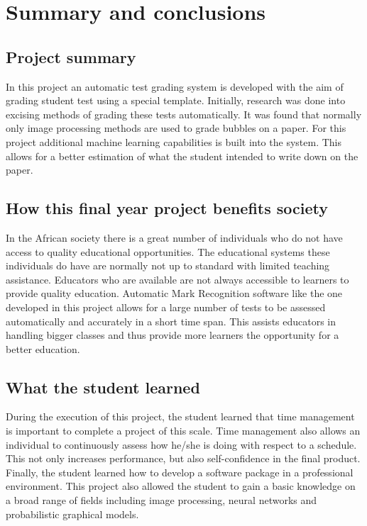 \def\baselinestretch{1}
\chapter{Summary and conclusions}
\label{ch:Conclusions}

\graphicspath{{Conclusions/Figures_Conclusions/}}
\section{Project summary}
In this project an automatic test grading system is developed with the aim of grading student test using a special template. Initially, research was done into excising methods of grading these tests automatically. It was found that normally only image processing methods are used to grade bubbles on a paper. For this project additional machine learning capabilities is built into the system. This allows for a better estimation of what the student  intended to write down on the paper.

\section{How this final year project benefits society}
In the African society there is a great number of individuals who do not have access to quality educational opportunities. The educational systems these individuals do have are normally not up to standard with limited teaching assistance. Educators who are available are not always accessible to learners to provide quality education. Automatic Mark Recognition software like the one developed in this project allows for a large number of tests to be assessed automatically and accurately in a short time span. This assists educators in handling bigger classes and thus provide more learners the opportunity for a better education.

\section{What the student learned}
During the execution of this project, the student learned that time management is important to complete a project of this scale. Time management also allows an individual to continuously assess how he/she is doing with respect to a schedule. This not only increases performance, but also self-confidence in the final product. Finally, the student learned how to develop a software package in a professional environment. This project also allowed the student to gain a basic knowledge on a broad range of fields including image processing, neural networks and probabilistic graphical models. 


